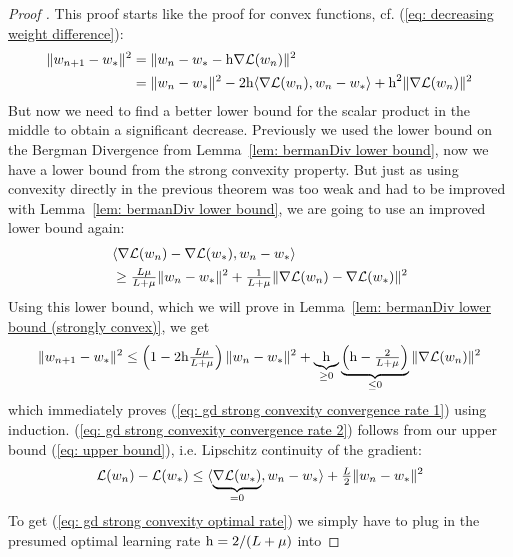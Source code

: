 \begin{proof}[Proof {\parencite[Theorem 2.1.15]{nesterovLecturesConvexOptimization2018}}]
	This proof starts like the proof for convex functions, cf. (\ref{eq:
	decreasing weight difference}):
 \begin{align*}
		\|w_{n+1} - w_*\|^2
		&= \| w_n -w_* - \text{h}\nabla\mathcal{L}(w_n)\|^2\\
		&= \| w_n - w_*\|^2
		- 2\text{h}\langle \nabla\mathcal{L}(w_n), w_n - w_*\rangle
		+ \text{h}^2 \| \nabla\mathcal{L}(w_n)\|^2
	\end{align*}
	But now we need to find a better lower bound for the scalar product in the
	middle to obtain a significant decrease. Previously we used the lower bound
	on the Bergman Divergence from Lemma~\ref{lem: bermanDiv lower bound}, now
	we have a lower bound from the strong convexity property. But just as using
	convexity directly in the previous theorem was too weak and had to be
	improved with Lemma~\ref{lem: bermanDiv lower bound}, we are going to use
	an improved lower bound again:
 	\begin{align*}
		&\langle \nabla\mathcal{L}(w_n) -\nabla\mathcal{L}(w_*), w_n - w_*\rangle	\\
		&\ge \tfrac{L\mu}{L+\mu}\|w_n - w_*\|^2
		+ \tfrac{1}{L+\mu}
		\|\nabla\mathcal{L}(w_n) - \nabla\mathcal{L}(w_*)\|^2
	\end{align*}
	Using this lower bound, which we will prove in Lemma~\ref{lem: bermanDiv
	lower bound (strongly convex)}, we get
 \begin{align*}
		\|w_{n+1} - w_*\|^2
		\le \left(1- 2\text{h} \tfrac{L\mu}{L+\mu}\right)
		\|w_n - w_*\|^2
		+ \underbrace{\text{h}}_{\ge 0}
		\underbrace{\left(\text{h}-\tfrac{2}{L+\mu}\right)}_{\le0}
		\|\nabla\mathcal{L}(w_n)\|^2
	\end{align*}
	which immediately proves (\ref{eq: gd strong convexity convergence rate
	1}) using induction. (\ref{eq: gd strong convexity convergence rate 2}) follows from our
	upper bound (\ref{eq: upper bound}), i.e. Lipschitz continuity of the gradient:
	\begin{align*}
		\mathcal{L}(w_n) - \mathcal{L}(w_*)
		\le \langle \underbrace{\nabla\mathcal{L}(w_*)}_{=0}, w_n - w_*\rangle
		+ \tfrac{L}{2} \| w_n - w_*\|^2
	\end{align*}
	To get (\ref{eq: gd strong convexity optimal rate}) we simply have to plug
	in the presumed optimal learning rate \(\text{h}=2/(L+\mu)\) into

\end{proof}
